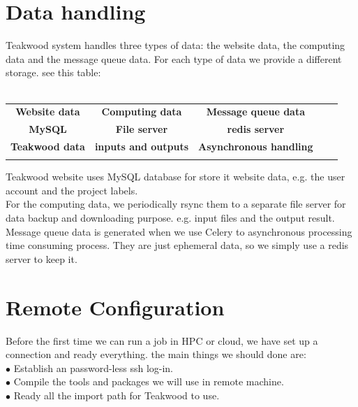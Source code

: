\section{Data handling}
Teakwood system handles three types of data: the website data, the computing data and the message queue data. For each type of data we provide a different storage. see this table:\\
\\   
\begin{table}[h]
\begin{tabular}{lllll}
\cline{1-3}
\multicolumn{1}{|c|}{\textbf{Website data}} & \multicolumn{1}{c|}{\textbf{Computing data}} & \multicolumn{1}{c|}{\textbf{Message queue data}} &  &  \\ \cline{1-3}
\multicolumn{1}{|c|}{\textbf{MySQL}} & \multicolumn{1}{c|}{\textbf{File server}} & \multicolumn{1}{c|}{\textbf{redis server}} &  &  \\ \cline{1-3}
\multicolumn{1}{|c|}{\textbf{Teakwood data}} & \multicolumn{1}{c|}{\textbf{inputs and outputs}} & \multicolumn{1}{c|}{\textbf{Asynchronous handling}} &  &  \\ \cline{1-3}
                                &                                &                                &  & 
\end{tabular}
\end{table}


Teakwood website uses MySQL database for store it website data, e.g. the user account and the project labels.\\
For the computing data, we periodically rsync them to a separate file server for data  backup and downloading purpose. e.g. input files and the output result.\\
Message queue data is generated when we use Celery to asynchronous processing time consuming process. They are just ephemeral data, so we simply use a redis server to keep it.\\

\section{Remote Configuration}
Before the first time we can run a job in HPC or cloud, we have set up a connection and ready everything. the main things we should done are:\\

$\bullet$ Establish an password-less ssh log-in.\\
$\bullet$ Compile the tools and packages we will use in remote machine.\\
$\bullet$ Ready all the import path for Teakwood to use.\\

